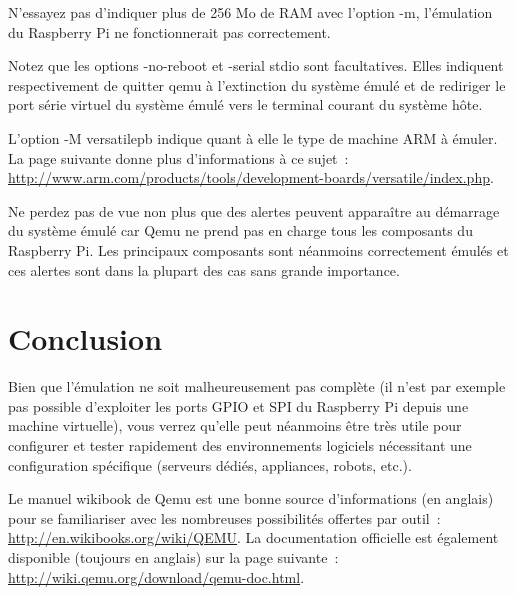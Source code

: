 \documentclass{article}
\begin{document}
N'essayez pas d'indiquer plus de 256 Mo de RAM avec l'option \og{}-m\fg{}, l'émulation
du Raspberry Pi ne fonctionnerait pas correctement.

Notez que les options \og{}-no-reboot\fg{} et \og{}-serial stdio\fg{} sont facultatives.
Elles indiquent respectivement de quitter qemu à l'extinction du système émulé et
de rediriger le port série virtuel du système émulé vers le terminal courant du
système hôte.

L'option \og{}-M versatilepb\fg{} indique quant à elle le type de machine ARM à
émuler. La page suivante donne plus d'informations à ce sujet~:
\href{https://web.archive.org/web/20150327192315/http://arm.com/products/tools/development-boards/versatile/index.php}{http://www.arm.com/products/tools/development-boards/versatile/index.php}.

Ne perdez pas de vue non plus que des alertes peuvent apparaître au démarrage
du système émulé car Qemu ne prend pas en charge tous les composants du
Raspberry Pi. Les principaux composants sont néanmoins correctement émulés et
ces alertes sont dans la plupart des cas sans grande importance.



\section*{Conclusion}\label{sec:ccl}

Bien que l'émulation ne soit malheureusement pas complète (il n'est par exemple
pas possible d'exploiter les ports GPIO et SPI du Raspberry Pi depuis une
machine virtuelle), vous verrez qu'elle peut néanmoins être très utile pour
configurer et tester rapidement des environnements logiciels nécessitant une
configuration spécifique (serveurs dédiés, appliances, robots, etc.).
 
Le manuel wikibook de Qemu est une bonne source d'informations (en anglais)
pour se familiariser avec les nombreuses possibilités offertes par outil~:
\url{http://en.wikibooks.org/wiki/QEMU}.
La documentation officielle est également disponible (toujours en anglais) sur la
page suivante~: \url{http://wiki.qemu.org/download/qemu-doc.html}.



\nocite{*}                    %
\end{document}
